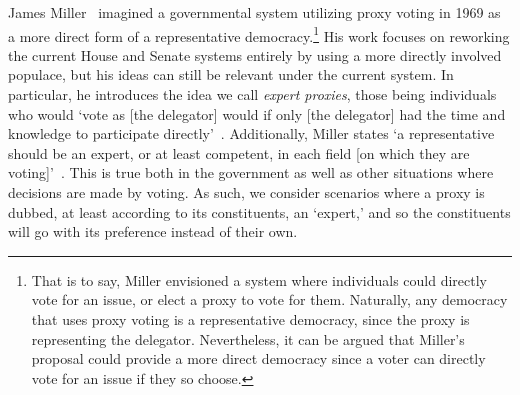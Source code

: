 James Miller~\cite{Miller1969} imagined a governmental system utilizing proxy voting
in 1969 as a more direct form of a representative democracy.\footnote{
    That is to say, Miller envisioned a system where individuals could directly vote
    for an issue, or elect a proxy to vote for them.
    Naturally, any democracy that uses proxy voting is a representative democracy,
    since the proxy is representing the delegator.
    Nevertheless, it can be argued that Miller's proposal could provide a more direct
    democracy since a voter can directly vote for an issue if they so choose.
}
His work focuses on reworking the current House and Senate systems entirely by using a
more directly involved populace, but his ideas can still be relevant under the current
system.
In particular, he introduces the idea we call \textit{expert proxies},
those being individuals who would `vote as [the delegator] would if only
[the delegator] had the time and knowledge to participate directly'~\cite{Miller1969}.
Additionally, Miller states `a representative should be an expert, or at least
competent, in each field [on which they are voting]'~\cite{Miller1969}.
This is true both in the government as well as other situations where decisions are
made by voting.
As such, we consider scenarios where a proxy is dubbed, at least according to its
constituents, an `expert,' and so the constituents will go with its preference
instead of their own.
